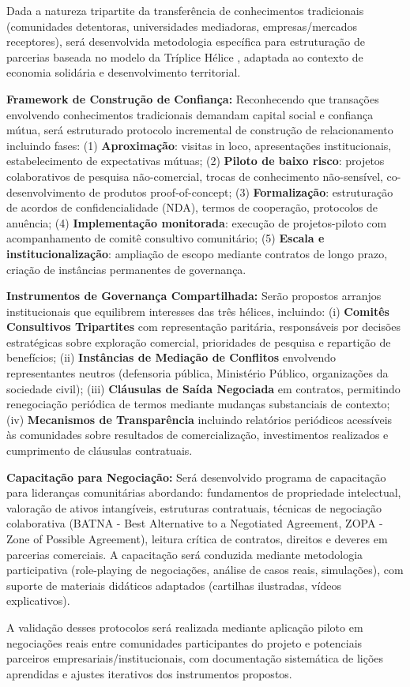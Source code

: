 Dada a natureza tripartite da transferência de conhecimentos tradicionais (comunidades detentoras, universidades mediadoras, empresas/mercados receptores), será desenvolvida metodologia específica para estruturação de parcerias baseada no modelo da Tríplice Hélice \cite{EtzkowitzLeydesdorff2000}, adaptada ao contexto de economia solidária e desenvolvimento territorial.

\textbf{Framework de Construção de Confiança:} Reconhecendo que transações envolvendo conhecimentos tradicionais demandam capital social e confiança mútua, será estruturado protocolo incremental de construção de relacionamento incluindo fases: (1) \textbf{Aproximação}: visitas in loco, apresentações institucionais, estabelecimento de expectativas mútuas; (2) \textbf{Piloto de baixo risco}: projetos colaborativos de pesquisa não-comercial, trocas de conhecimento não-sensível, co-desenvolvimento de produtos proof-of-concept; (3) \textbf{Formalização}: estruturação de acordos de confidencialidade (NDA), termos de cooperação, protocolos de anuência; (4) \textbf{Implementação monitorada}: execução de projetos-piloto com acompanhamento de comitê consultivo comunitário; (5) \textbf{Escala e institucionalização}: ampliação de escopo mediante contratos de longo prazo, criação de instâncias permanentes de governança.

\textbf{Instrumentos de Governança Compartilhada:} Serão propostos arranjos institucionais que equilibrem interesses das três hélices, incluindo: (i) \textbf{Comitês Consultivos Tripartites} com representação paritária, responsáveis por decisões estratégicas sobre exploração comercial, prioridades de pesquisa e repartição de benefícios; (ii) \textbf{Instâncias de Mediação de Conflitos} envolvendo representantes neutros (defensoria pública, Ministério Público, organizações da sociedade civil); (iii) \textbf{Cláusulas de Saída Negociada} em contratos, permitindo renegociação periódica de termos mediante mudanças substanciais de contexto; (iv) \textbf{Mecanismos de Transparência} incluindo relatórios periódicos acessíveis às comunidades sobre resultados de comercialização, investimentos realizados e cumprimento de cláusulas contratuais.

\textbf{Capacitação para Negociação:} Será desenvolvido programa de capacitação para lideranças comunitárias abordando: fundamentos de propriedade intelectual, valoração de ativos intangíveis, estruturas contratuais, técnicas de negociação colaborativa (BATNA - Best Alternative to a Negotiated Agreement, ZOPA - Zone of Possible Agreement), leitura crítica de contratos, direitos e deveres em parcerias comerciais. A capacitação será conduzida mediante metodologia participativa (role-playing de negociações, análise de casos reais, simulações), com suporte de materiais didáticos adaptados (cartilhas ilustradas, vídeos explicativos).

A validação desses protocolos será realizada mediante aplicação piloto em negociações reais entre comunidades participantes do projeto e potenciais parceiros empresariais/institucionais, com documentação sistemática de lições aprendidas e ajustes iterativos dos instrumentos propostos.




